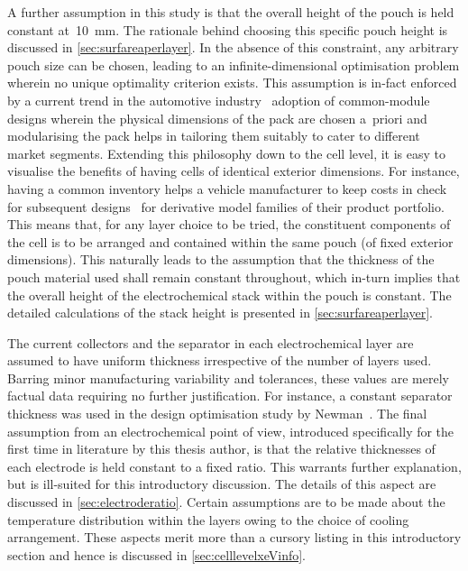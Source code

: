A further assumption  in this study is  that the overall height of  the pouch is
held constant at~\SI{10}{\milli\meter}. The rationale behind choosing this
specific pouch height is  discussed in  \cref{sec:surfareaperlayer}. In  the
absence of this constraint, any arbitrary pouch size can be chosen,  leading to
an  infinite-dimensional optimisation problem  wherein no unique optimality 
criterion exists.  This assumption is  in-fact enforced  by a current  trend  in
the  automotive industry  \viz~adoption  of  common-module designs wherein  the
physical dimensions of  the pack  are chosen  a~priori and modularising the 
pack helps in  tailoring them  suitably to cater  to different market segments.
Extending this philosophy down to the cell level, it is easy to visualise the 
benefits of having cells of  identical exterior  dimensions. For instance,
having a  common inventory helps a vehicle manufacturer  to keep costs in check 
for subsequent designs  \eg~for  derivative model families  of their product 
portfolio. This means that,  for  any layer  choice to  be tried,  the
constituent components of the cell is  to be arranged and  contained within the
same  pouch  (of  fixed exterior  dimensions).  This  naturally  leads  to  the
assumption that the thickness of the pouch material used  shall remain constant
throughout, which in-turn implies that the overall height of the electrochemical
stack  within the pouch is  constant. The  detailed calculations  of the  stack
height is presented in \cref{sec:surfareaperlayer}.

The  current collectors  and the  separator  in each  electrochemical layer  are
assumed  to  have  uniform  thickness  irrespective  of  the  number  of  layers
used.  Barring  minor manufacturing  variability  and  tolerances, these  values
are  merely  factual data  requiring  no  further justification.  For  instance,
a  constant  separator thickness  was  used  in  the design  optimisation  study
by  Newman~\cite{Newman1995}.  The  final  assumption  from  an  electrochemical
point  of view,  introduced specifically  for the  first time  in literature  by
this  thesis author,  is  that the  relative thicknesses  of  each electrode  is
held  constant to  a  fixed ratio.  This warrants  further  explanation, but  is
ill-suited  for this  introductory discussion.  The details  of this  aspect are
discussed  in  \cref{sec:electroderatio}. Certain  assumptions  are  to be  made
about the  temperature distribution  within the  layers owing  to the  choice of
cooling arrangement.  These aspects merit  more than  a cursory listing  in this
introductory section and hence is discussed in \cref{sec:celllevelxeVinfo}.

